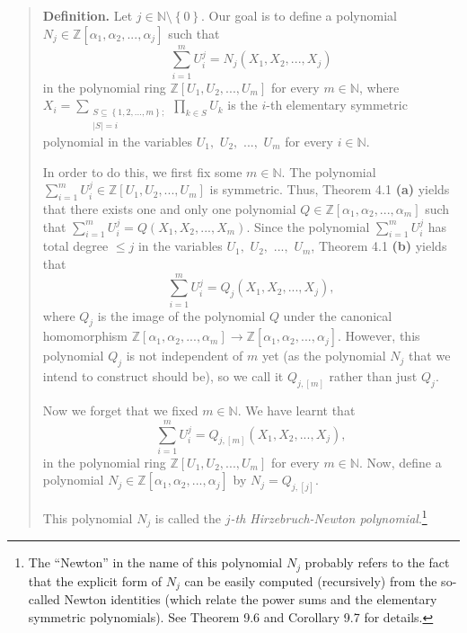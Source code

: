 \documentclass[numbers=enddot,12pt,final,onecolumn,notitlepage]{scrartcl}%
\begin{document}
\begin{quote}
\textbf{Definition.} Let $j\in\mathbb{N}\setminus\left\{  0\right\}  $. Our
goal is to define a polynomial $N_{j}\in\mathbb{Z}\left[  \alpha_{1}%
,\alpha_{2},...,\alpha_{j}\right]  $ such that%
\begin{equation}
\sum_{i=1}^{m}U_{i}^{j}=N_{j}\left(  X_{1},X_{2},...,X_{j}\right)  \label{Nj1}%
\end{equation}
in the polynomial ring $\mathbb{Z}\left[  U_{1},U_{2},...,U_{m}\right]  $ for
every $m\in\mathbb{N}$, where $X_{i}=\sum\limits_{\substack{S\subseteq\left\{
1,2,...,m\right\}  ;\\\left\vert S\right\vert =i}}\prod\limits_{k\in S}U_{k}$
is the $i$-th elementary symmetric polynomial in the variables $U_{1},$
$U_{2},$ $...,$ $U_{m}$ for every $i\in\mathbb{N}$.

In order to do this, we first fix some $m\in\mathbb{N}$. The polynomial
$\sum\limits_{i=1}^{m}U_{i}^{j}\in\mathbb{Z}\left[  U_{1},U_{2},...,U_{m}%
\right]  $ is symmetric. Thus, Theorem 4.1 \textbf{(a)} yields that there
exists one and only one polynomial $Q\in\mathbb{Z}\left[  \alpha_{1}%
,\alpha_{2},...,\alpha_{m}\right]  $ such that $\sum\limits_{i=1}^{m}U_{i}%
^{j}=Q\left(  X_{1},X_{2},...,X_{m}\right)  .$ Since the polynomial
$\sum\limits_{i=1}^{m}U_{i}^{j}$ has total degree $\leq j$ in the variables
$U_{1},$ $U_{2},$ $...,$ $U_{m}$, Theorem 4.1 \textbf{(b)} yields that%
\[
\sum_{i=1}^{m}U_{i}^{j}=Q_{j}\left(  X_{1},X_{2},...,X_{j}\right)  ,
\]
where $Q_{j}$ is the image of the polynomial $Q$ under the canonical
homomorphism $\mathbb{Z}\left[  \alpha_{1},\alpha_{2},...,\alpha_{m}\right]
\rightarrow\mathbb{Z}\left[  \alpha_{1},\alpha_{2},...,\alpha_{j}\right]  $.
However, this polynomial $Q_{j}$ is not independent of $m$ yet (as the
polynomial $N_{j}$ that we intend to construct should be), so we call it
$Q_{j,\left[  m\right]  }$ rather than just $Q_{j}$.

Now we forget that we fixed $m\in\mathbb{N}$. We have learnt that%
\[
\sum_{i=1}^{m}U_{i}^{j}=Q_{j,\left[  m\right]  }\left(  X_{1},X_{2}%
,...,X_{j}\right)  ,
\]
in the polynomial ring $\mathbb{Z}\left[  U_{1},U_{2},...,U_{m}\right]  $ for
every $m\in\mathbb{N}$. Now, define a polynomial $N_{j}\in\mathbb{Z}\left[
\alpha_{1},\alpha_{2},...,\alpha_{j}\right]  $ by $N_{j}=Q_{j,\left[
j\right]  }.$

This polynomial $N_{j}$ is called the $j$\textit{-th Hirzebruch-Newton
polynomial}.\footnote{The ``Newton'' in the name of this polynomial $N_{j}$
probably refers to the fact that the explicit form of $N_{j}$ can be easily
computed (recursively) from the so-called Newton identities (which relate the
power sums and the elementary symmetric polynomials). See Theorem 9.6 and
Corollary 9.7 for details.}


\end{quote}
\end{document}
